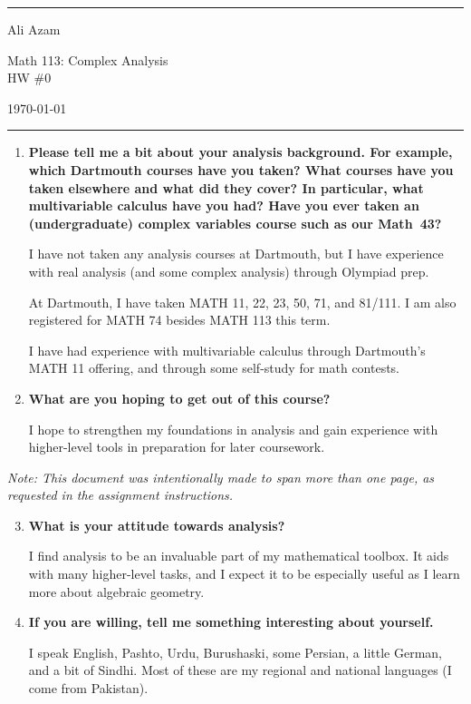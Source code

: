 \documentclass[a4paper]{article}
\begin{document}
\hrule\medskip
\begin{minipage}{0.295\textwidth}\raggedright\footnotesize
Ali Azam
\end{minipage}%
\begin{minipage}{0.4\textwidth}\centering
\large{Math 113: Complex Analysis}\\
\normalsize HW \#0
\end{minipage}%
\begin{minipage}{0.295\textwidth}\raggedleft
\today
\end{minipage}
\medskip\hrule\bigskip

\begin{enumerate}
    \item \textbf{Please tell me a bit about your analysis background. For example, which Dartmouth courses have you taken? What courses have you taken elsewhere and what did they cover? In particular, what multivariable calculus have you had? Have you ever taken an (undergraduate) complex variables course such as our Math~43?}
    
    I have not taken any analysis courses at Dartmouth, but I have experience with real analysis (and some complex analysis) through Olympiad prep. 
    
    At Dartmouth, I have taken MATH 11, 22, 23, 50, 71, and 81/111. I am also registered for MATH 74 besides MATH 113 this term.

    I have had experience with multivariable calculus through Dartmouth's MATH 11 offering, and through some self-study for math contests.

    \item \textbf{What are you hoping to get out of this course?}
    
    I hope to strengthen my foundations in analysis and gain experience with higher-level tools in preparation for later coursework.
\end{enumerate}

\vfill
\noindent\footnotesize\textit{Note: This document was intentionally made to span more than one page, as requested in the assignment instructions.}

\newpage
\normalsize
\begin{enumerate}\setcounter{enumi}{2}
    \item \textbf{What is your attitude towards analysis?}

    I find analysis to be an invaluable part of my mathematical toolbox. It aids with many higher-level tasks, and I expect it to be especially useful as I learn more about algebraic geometry.

    \item \textbf{If you are willing, tell me something interesting about yourself.}

    I speak English, Pashto, Urdu, Burushaski, some Persian, a little German, and a bit of Sindhi. Most of these are my regional and national languages (I come from Pakistan).
\end{enumerate}
\end{document}
